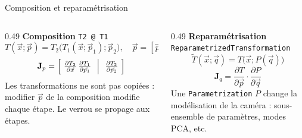 \documentclass[aspectratio=169,11pt]{beamer}
\newcommand{\code}[1]{\texttt{\small #1}}
\newcommand{\cls}[1]{\textcolor{pyblue}{\texttt{#1}}}
\begin{document}
\begin{frame}{Composition et reparamétrisation}
  \begin{columns}[T]
    \begin{column}{0.49\textwidth}
      \textbf{Composition} \hfill \code{T2 @ T1}
      \[
        T(\vec{x};\vec{p}) = T_2\bigl(T_1(\vec{x};\vec{p}_1);\vec{p}_2\bigr),
        \quad \vec{p} = [\vec{p}_1, \vec{p}_2]
      \]
      \[
        \mathbf{J}_p = \Bigl[\ \tfrac{\partial T_2}{\partial \vec{x}}\,\tfrac{\partial T_1}{\partial \vec{p}_1}
        \ \ \Big|\ \ \tfrac{\partial T_2}{\partial \vec{p}_2}\ \Bigr]
      \]
      \small Les transformations ne sont pas copiées : modifier $\vec{p}$ de la
      composition modifie chaque étape. Le verrou se propage aux étapes.
    \end{column}
    \begin{column}{0.49\textwidth}
      \textbf{Reparamétrisation} \hfill \cls{ReparametrizedTransformation}
      \[
        \tilde{T}(\vec{x};\vec{q}) = T\bigl(\vec{x}; P(\vec{q})\bigr)
      \]
      \[
        \mathbf{J}_q = \frac{\partial T}{\partial \vec{p}} \cdot \frac{\partial P}{\partial \vec{q}}
      \]
      \small Une \cls{Parametrization} $P$ change la \alert{modélisation} de la
      caméra : sous-ensemble de paramètres, modes PCA, etc.
    \end{column}
  \end{columns}
\end{frame}
 
\end{document}
